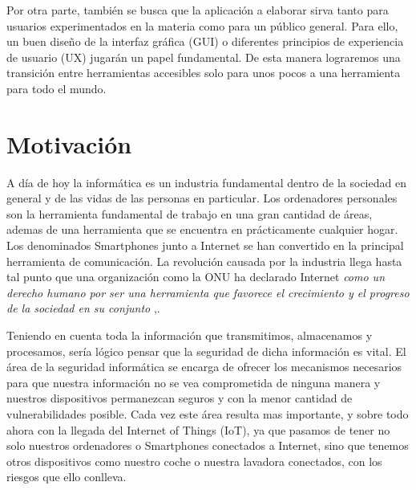 Por otra parte, también se busca que la aplicación a elaborar sirva tanto para usuarios experimentados en la materia como para un público general. Para ello, un buen diseño de la interfaz gráfica (GUI) o diferentes principios de experiencia de usuario (UX) jugarán un papel fundamental. De esta manera lograremos una transición entre herramientas accesibles solo para unos pocos a una herramienta para todo el mundo.

\section{Motivación}

A día de hoy la informática es un industria fundamental dentro de la sociedad en general y de las vidas de las personas en particular. Los ordenadores personales son la herramienta fundamental de trabajo en una gran cantidad de áreas, ademas de una herramienta que se encuentra en prácticamente cualquier hogar. Los denominados Smartphones junto a Internet se han convertido en la principal herramienta de comunicación. La revolución causada por la industria llega hasta tal punto que una organización como la ONU ha declarado Internet \textit{como un derecho humano por ser una herramienta que favorece el crecimiento y el progreso de la sociedad en su conjunto} \cite{onu-internet},.

Teniendo en cuenta toda la información que transmitimos, almacenamos y procesamos, sería lógico pensar que la seguridad de dicha información es vital. El área de la seguridad informática se encarga de ofrecer los mecanismos necesarios para que nuestra información no se vea comprometida de ninguna manera y nuestros dispositivos permanezcan seguros y con la menor cantidad de vulnerabilidades posible. Cada vez este área resulta mas importante, y sobre todo ahora con la llegada del Internet of Things (IoT), ya que pasamos de tener no solo nuestros ordenadores o Smartphones conectados a Internet, sino que tenemos otros dispositivos como nuestro coche o nuestra lavadora conectados, con los riesgos que ello conlleva.